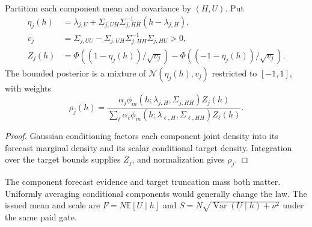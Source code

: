 \begin{proposition}
\label{cjt_analytic_target_conditioning}
Partition each component mean and covariance by $(H,U)$.  Put
\begin{align}
 \eta_j(h)&=\lambda_{j,U}+\Sigma_{j,UH}\Sigma_{j,HH}^{-1}
                 (h-\lambda_{j,H}),\nonumber\\
 v_j&=\Sigma_{j,UU}-\Sigma_{j,UH}\Sigma_{j,HH}^{-1}\Sigma_{j,HU}>0,\nonumber\\
 Z_j(h)&=\Phi((1-\eta_j(h))/\sqrt{v_j})
          -\Phi((-1-\eta_j(h))/\sqrt{v_j}).
 \label{cjt_conditional_component_parameters}
\end{align}
The bounded posterior is a mixture of
$\mathcal N(\eta_j(h),v_j)$ restricted to $[-1,1]$, with weights
\begin{equation}
 \rho_j(h)=\frac{\alpha_j\phi_m(h;\lambda_{j,H},\Sigma_{j,HH})Z_j(h)}
 {\sum_\ell\alpha_\ell\phi_m(h;\lambda_{\ell,H},\Sigma_{\ell,HH})Z_\ell(h)}.
 \label{cjt_conditional_component_weights}
\end{equation}
\end{proposition}
\begin{proof}
Gaussian conditioning factors each component joint density into its forecast
marginal density and its scalar conditional target density.  Integration over
the target bounds supplies $Z_j$, and normalization gives $\rho_j$.
\end{proof}
The component forecast evidence and target truncation mass both matter.
Uniformly averaging conditional components would generally change the law.
The issued mean and scale are $F=N\mathbb E[U\mid h]$ and
$S=N\sqrt{\operatorname{Var}(U\mid h)+\nu^2}$ under the same paid gate.

